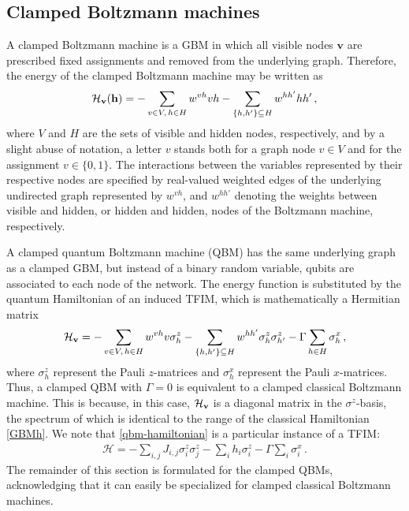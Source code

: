 \documentclass[pra,twocolumn,floatfix,superscriptaddress]{revtex4}
\begin{document}
\subsection{Clamped Boltzmann machines}\label{sec:boltzmann}

A clamped Boltzmann machine is a GBM in which all visible nodes $\mathbf v$ are prescribed fixed assignments and removed from the underlying graph. Therefore, the energy of the clamped Boltzmann machine may be written as  
\begin{align}
\mathcal H_{\bold v}(\bold h)= -\sum_{v \in V,\, h \in H} w^{vh}v h -\sum_{\{h, h'\} \subseteq H} w^{hh'} hh'\,,   \label{GBMh}
\end{align}
where $V$ and $H$ are the sets of visible and hidden nodes, respectively, and by a slight abuse of notation, a letter $v$ stands both for a graph node $v \in V$ and for the assignment $v \in \{0, 1\}$. The interactions between the variables represented by their respective nodes are specified by real-valued weighted edges of the underlying undirected graph represented by $w^{vh}$, and $w^{hh'}$ denoting the weights between visible and hidden, or hidden and hidden, nodes of the Boltzmann machine, respectively. 

A clamped quantum Boltzmann machine (QBM) has the same underlying graph as a clamped GBM, but instead of a binary random variable, qubits are associated to each node of the network. The energy function is substituted by the quantum Hamiltonian of an induced TFIM, which is mathematically a Hermitian matrix
\begin{align}\label{qbm-hamiltonian}
\mathcal{H}_{\bold v}= -\sum_{v \in V,\, h \in H} w^{vh}v \sigma^z_h -\sum_{\{h, h'\} \subseteq H} w^{hh'} \sigma^z_h\sigma^z_{h'} - \Gamma \sum_{h \in H} \sigma_h^x\,,  
\end{align}
where $\sigma_h^z$ represent the Pauli $z$-matrices and $\sigma^x_h$ represent the Pauli $x$-matrices. 
Thus, a clamped QBM with $\Gamma = 0$ is equivalent to a clamped classical Boltzmann machine. This is because, in this case, $\mathcal H_{\bold v}$ is a diagonal matrix in the $\sigma^z$-basis, the spectrum of which is identical to the range of the classical Hamiltonian \eqref{GBMh}. We note that \eqref{qbm-hamiltonian} is a particular instance of a TFIM: 
\begin{align}\label{tfim}
\mathcal{H}= -\sum_{i, j} J_{i, j} \sigma_i^z \sigma_j^z - \sum_{i} h_i \sigma_i^z - \Gamma \sum_i \sigma_i^x\,.
\end{align}
The remainder of this section is formulated for the clamped QBMs, acknowledging that it can easily be specialized for clamped classical Boltzmann machines.  
\end{document}
